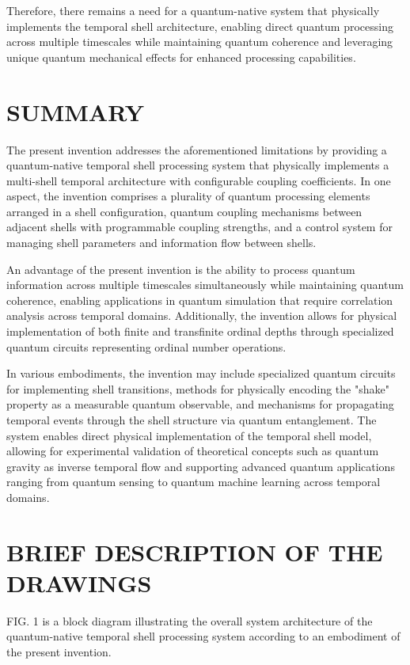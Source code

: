 \documentclass[12pt,letterpaper]{article}
\begin{document}
Therefore, there remains a need for a quantum-native system that physically implements the temporal shell architecture, enabling direct quantum processing across multiple timescales while maintaining quantum coherence and leveraging unique quantum mechanical effects for enhanced processing capabilities.

\section*{SUMMARY}

The present invention addresses the aforementioned limitations by providing a quantum-native temporal shell processing system that physically implements a multi-shell temporal architecture with configurable coupling coefficients. In one aspect, the invention comprises a plurality of quantum processing elements arranged in a shell configuration, quantum coupling mechanisms between adjacent shells with programmable coupling strengths, and a control system for managing shell parameters and information flow between shells.

An advantage of the present invention is the ability to process quantum information across multiple timescales simultaneously while maintaining quantum coherence, enabling applications in quantum simulation that require correlation analysis across temporal domains. Additionally, the invention allows for physical implementation of both finite and transfinite ordinal depths through specialized quantum circuits representing ordinal number operations.

In various embodiments, the invention may include specialized quantum circuits for implementing shell transitions, methods for physically encoding the "shake" property as a measurable quantum observable, and mechanisms for propagating temporal events through the shell structure via quantum entanglement. The system enables direct physical implementation of the temporal shell model, allowing for experimental validation of theoretical concepts such as quantum gravity as inverse temporal flow and supporting advanced quantum applications ranging from quantum sensing to quantum machine learning across temporal domains.

\section*{BRIEF DESCRIPTION OF THE DRAWINGS}

FIG. 1 is a block diagram illustrating the overall system architecture of the quantum-native temporal shell processing system according to an embodiment of the present invention.
\end{document}
